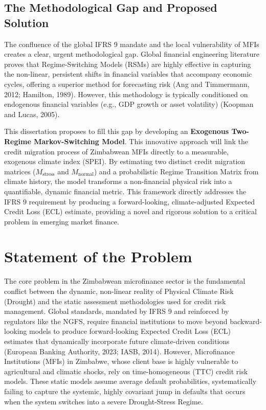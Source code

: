 \documentclass[12pt,a4paper]{article}
\newcommand{\Mnormal}{M_{\text{normal}}}
\newcommand{\Mstress}{M_{\text{stress}}}
\begin{document}
\subsection{The Methodological Gap and Proposed Solution}

The confluence of the global IFRS 9 mandate and the local vulnerability of MFIs creates a clear, urgent methodological gap. Global financial engineering literature proves that Regime-Switching Models (RSMs) are highly effective in capturing the non-linear, persistent shifts in financial variables that accompany economic cycles, offering a superior method for forecasting risk (Ang and Timmermann, 2012; Hamilton, 1989). However, this methodology is typically conditioned on endogenous financial variables (e.g., GDP growth or asset volatility) (Koopman and Lucas, 2005).

This dissertation proposes to fill this gap by developing an \textbf{Exogenous Two-Regime Markov-Switching Model}. This innovative approach will link the credit migration process of Zimbabwean MFIs directly to a measurable, exogenous climate index (SPEI). By estimating two distinct credit migration matrices ($\Mstress$ and $\Mnormal$) and a probabilistic Regime Transition Matrix from climate history, the model transforms a non-financial physical risk into a quantifiable, dynamic financial metric. This framework directly addresses the IFRS 9 requirement by producing a forward-looking, climate-adjusted Expected Credit Loss (ECL) estimate, providing a novel and rigorous solution to a critical problem in emerging market finance.

\section{Statement of the Problem}

The core problem in the Zimbabwean microfinance sector is the fundamental conflict between the dynamic, non-linear reality of Physical Climate Risk (Drought) and the static assessment methodologies used for credit risk management. Global standards, mandated by IFRS 9 and reinforced by regulators like the NGFS, require financial institutions to move beyond backward-looking models to produce forward-looking Expected Credit Loss (ECL) estimates that dynamically incorporate future climate-driven conditions (European Banking Authority, 2023; IASB, 2014). However, Microfinance Institutions (MFIs) in Zimbabwe, whose client base is highly vulnerable to agricultural and climatic shocks, rely on time-homogeneous (TTC) credit risk models. These static models assume average default probabilities, systematically failing to capture the systemic, highly covariant jump in defaults that occurs when the system switches into a severe Drought-Stress Regime.
\end{document}
